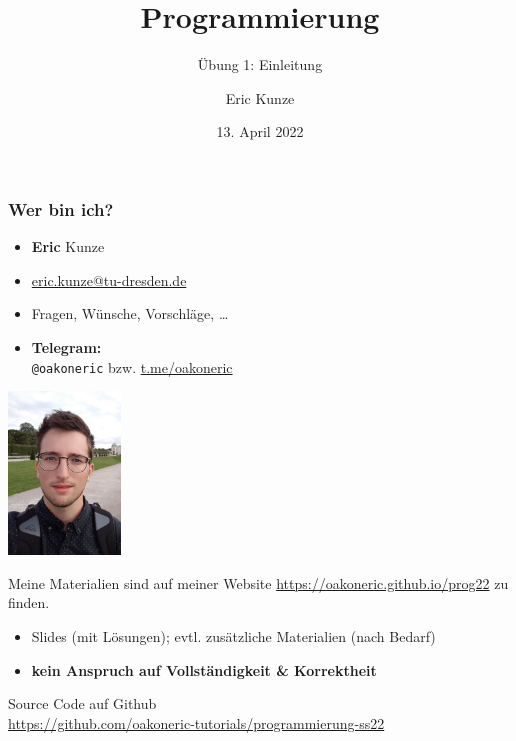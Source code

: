 \documentclass{beamer}
\begin{document}
	
	\title{Programmierung}
	\subtitle{Übung 1: Einleitung}
	\author{Eric Kunze}
	\date{13. April 2022}

	\maketitle
	
	\begin{frame} \frametitle{Wer bin ich?}
		\footnotesize
		\begin{minipage}{\dimexpr0.75\linewidth-\fboxrule-\fboxsep}
			\flushleft \normalsize
			\begin{itemize}
				\item \textbf{Eric} \textcolor{cdgray!50}{Kunze}
				\item \url{eric.kunze@tu-dresden.de}
				\item Fragen, Wünsche, Vorschläge, \dots 
				\item \textbf{Telegram:} \\ 
				\texttt{@oakoneric} bzw. \url{t.me/oakoneric}
			\end{itemize}
		\end{minipage}
		\begin{minipage}{\dimexpr0.25\linewidth-\fboxrule-\fboxsep}
			\includegraphics[width=3cm]{./tut01_pic.jpg}
		\end{minipage}		
	
		Meine Materialien sind auf meiner Website \url{https://oakoneric.github.io/prog22} zu finden.
		\begin{itemize}
			\item Slides (mit Lösungen); evtl. zusätzliche Materialien (nach Bedarf)
			\item \alert{\textbf{kein Anspruch auf Vollständigkeit \& Korrektheit}}
		\end{itemize}
		
		Source Code auf Github \\
		\url{https://github.com/oakoneric-tutorials/programmierung-ss22}
	\end{frame}
	
\end{document}
